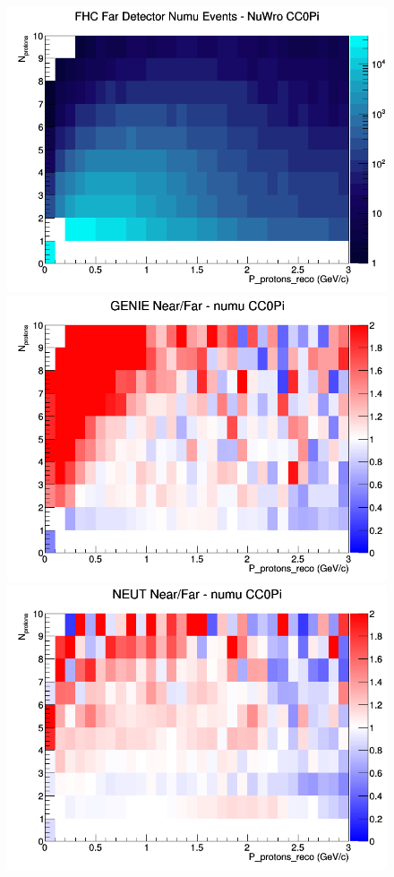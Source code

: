 \begin{figure}[h]
\endminipage
{}
\includegraphics[width=\linewidth]{eff_N_P/GAr/protons/CC0Pi_FHC_FD_numu_N_P_NuWro.png}
\endminipage
\newline
{}
\includegraphics[width=\linewidth]{eff_N_P/GAr/protons/ratios/CC0Pi_GENIE_numu_NF_N_P.png}
\endminipage
{}
\includegraphics[width=\linewidth]{eff_N_P/GAr/protons/ratios/CC0Pi_NEUT_numu_NF_N_P.png}

\end{figure}
